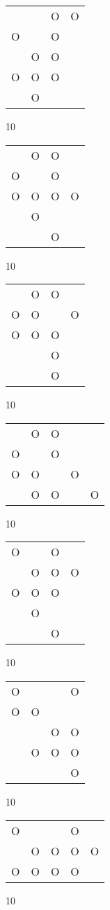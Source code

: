 \begin{tabular}{|m{0.2cm}m{0.2cm}m{0.2cm}m{0.2cm}|}\hline
 & &O&O\\
O& &O& \\
 &O&O& \\
O&O&O& \\
 &O& & \\
\hline\end{tabular}10
\begin{tabular}{|m{0.2cm}m{0.2cm}m{0.2cm}m{0.2cm}|}\hline
 &O&O& \\
O& &O& \\
O&O&O&O\\
 &O& & \\
 & &O& \\
\hline\end{tabular}10
\begin{tabular}{|m{0.2cm}m{0.2cm}m{0.2cm}m{0.2cm}|}\hline
 &O&O& \\
O&O& &O\\
O&O&O& \\
 & &O& \\
 & &O& \\
\hline\end{tabular}10
\begin{tabular}{|m{0.2cm}m{0.2cm}m{0.2cm}m{0.2cm}m{0.2cm}|}\hline
 &O&O& & \\
O& &O& & \\
O&O& &O& \\
 &O&O& &O\\
\hline\end{tabular}10
\begin{tabular}{|m{0.2cm}m{0.2cm}m{0.2cm}m{0.2cm}|}\hline
O& &O& \\
 &O&O&O\\
O&O&O& \\
 &O& & \\
 & &O& \\
\hline\end{tabular}10
\begin{tabular}{|m{0.2cm}m{0.2cm}m{0.2cm}m{0.2cm}|}\hline
O& & &O\\
O&O& & \\
 & &O&O\\
 &O&O&O\\
 & & &O\\
\hline\end{tabular}10
\begin{tabular}{|m{0.2cm}m{0.2cm}m{0.2cm}m{0.2cm}m{0.2cm}|}\hline
O& & &O& \\
 &O&O&O&O\\
O&O&O&O& \\
\hline\end{tabular}10
